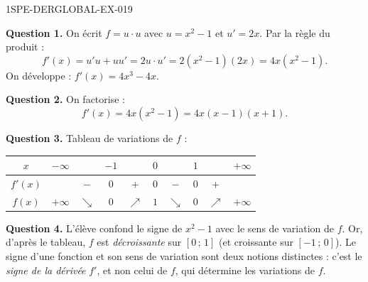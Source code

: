 \begin{corrige}{1SPE-DERGLOBAL-EX-019}

\textbf{Question 1.} On écrit $f = u \cdot u$ avec $u = x^2-1$ et $u' = 2x$. Par la règle du produit :
\[
f'(x) = u'u + uu' = 2u \cdot u' = 2(x^2-1)(2x) = 4x(x^2-1).
\]
On développe : $f'(x) = 4x^3-4x$.

\textbf{Question 2.} On factorise :
\[
f'(x) = 4x(x^2-1) = 4x(x-1)(x+1).
\]

\textbf{Question 3.} Tableau de variations de $f$ :

\begin{center}
\begin{tabular}{|c|ccccccccc|}
\hline
$x$ & $-\infty$ & & $-1$ & & $0$ & & $1$ & & $+\infty$ \\
\hline
$f'(x)$ & & $-$ & $0$ & $+$ & $0$ & $-$ & $0$ & $+$ & \\
\hline
$f(x)$ & $+\infty$ & $\searrow$ & $0$ & $\nearrow$ & $1$ & $\searrow$ & $0$ & $\nearrow$ & $+\infty$ \\
\hline
\end{tabular}
\end{center}

\textbf{Question 4.} L'élève confond le signe de $x^2-1$ avec le sens de variation de $f$. Or, d'après le tableau, $f$ est \emph{décroissante} sur $[0\,;\,1]$ (et croissante sur $[-1\,;\,0]$). Le signe d'une fonction et son sens de variation sont deux notions distinctes : c'est le \emph{signe de la dérivée} $f'$, et non celui de $f$, qui détermine les variations de $f$.
\end{corrige}
